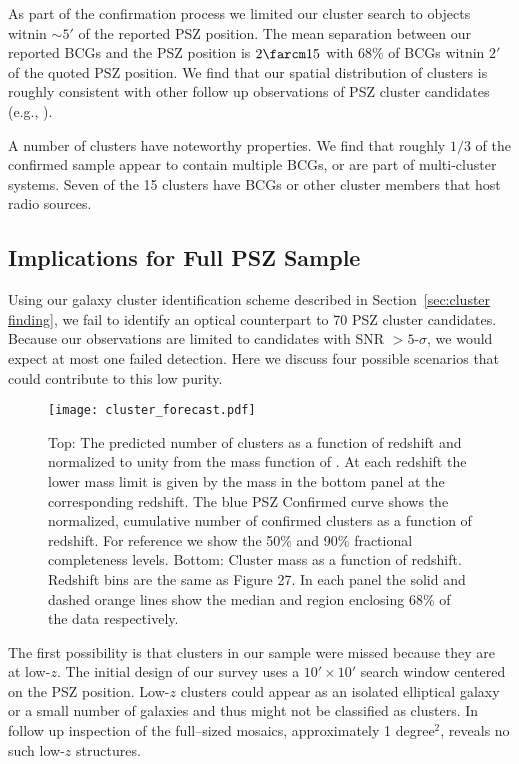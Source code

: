 \documentclass[apj, revtex4-1]{emulateapj}
\newcommand{\degsq}{\hbox{degree$^2$}}
\newcommand{\eg}{e.g.}
\newcommand{\citeeg}[1]{(\eg, \citealt{#1})}
\begin{document}
As part of the confirmation process we limited our cluster search to objects witnin $\sim$$5'$ of the reported PSZ position. The mean separation between our reported BCGs and the PSZ position is $2\farcm15$ with 68\% of BCGs witnin $2'$ of the quoted PSZ position. We find that our spatial distribution of clusters is roughly consistent with other follow up observations of PSZ cluster candidates \citeeg{Barrena2018}.

A number of clusters have noteworthy properties. We find that roughly $1/3$ of the confirmed sample appear to contain multiple BCGs, or are part of multi-cluster systems. Seven of the 15 clusters have BCGs or other cluster members that host radio sources.

\subsection{Implications for Full PSZ Sample}
Using our galaxy cluster identification scheme described in Section~\ref{sec:cluster finding}, we fail to identify an optical counterpart to 70 PSZ cluster candidates. Because our observations are limited to candidates with SNR $>5$-$\sigma$, we would expect at most one failed detection. Here we discuss four possible scenarios that could contribute to this low purity.

\begin{figure}
	\texttt{[image: cluster\_forecast.pdf]}
	\caption{Top: The predicted number of clusters as a function of redshift and normalized to unity from the mass function of \cite{Tinker2008}. At each redshift the lower mass limit is given by the mass in the bottom panel at the corresponding redshift. The blue PSZ Confirmed curve shows the normalized, cumulative number of confirmed clusters as a function of redshift. For reference we show the 50\% and 90\% fractional completeness levels. Bottom: Cluster mass as a function of redshift. Redshift bins are the same as \cite{PlanckCollaboration2015a} Figure 27. In each panel the solid and dashed orange lines show the median and region enclosing 68\% of the data respectively.}
	\label{fig:cluster_forecast}
\end{figure}

The first possibility is that clusters in our sample were missed because they are at low-$z$. The initial design of our survey uses a $10'\times10'$ search window centered on the PSZ position. Low-$z$ clusters could appear as an isolated elliptical galaxy or a small number of galaxies and thus might not be classified as clusters. In follow up inspection of the full--sized mosaics, approximately 1 \degsq, reveals no such low-$z$ structures.
\end{document}

